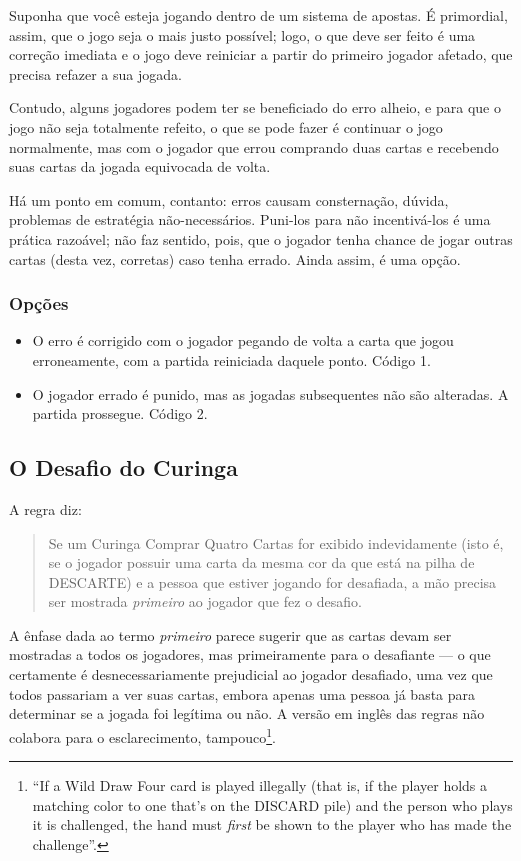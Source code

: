 Suponha que você esteja jogando dentro de um sistema de apostas. É primordial, assim, que o jogo seja o mais justo possível; logo, o que deve ser feito é uma correção imediata e o jogo deve reiniciar a partir do primeiro jogador afetado, que precisa refazer a sua jogada.

Contudo, alguns jogadores podem ter se beneficiado do erro alheio, e para que o jogo não seja totalmente refeito, o que se pode fazer é continuar o jogo normalmente, mas com o jogador que errou comprando duas cartas e recebendo suas cartas da jogada equivocada de volta.

Há um ponto em comum, contanto: erros causam consternação, dúvida, problemas de estratégia não-necessários. Puni-los para não incentivá-los é uma prática razoável; não faz sentido, pois, que o jogador tenha chance de jogar outras cartas (desta vez, corretas) caso tenha errado. Ainda assim, é uma opção.

\subsubsection{Opções}

\begin{itemize}
\item{O erro é corrigido com o jogador pegando de volta a carta que jogou erroneamente, com a partida reiniciada daquele ponto. Código 1.}
\item{O jogador errado é punido, mas as jogadas subsequentes não são alteradas. A partida prossegue. Código 2.}
\end{itemize}

\subsection{O Desafio do Curinga}

A regra diz:

\begin{quote}
Se um Curinga Comprar Quatro Cartas for exibido indevidamente (isto é, se o jogador possuir uma carta da mesma cor da que está na pilha de DESCARTE) e a pessoa que estiver jogando for desafiada, a mão precisa ser mostrada \textit{primeiro} ao jogador que fez o desafio.
\end{quote}

A ênfase dada ao termo \textit{primeiro} parece sugerir que as cartas devam ser mostradas a todos os jogadores, mas primeiramente para o desafiante --- o que certamente é desnecessariamente prejudicial ao jogador desafiado, uma vez que todos passariam a ver suas cartas, embora apenas uma pessoa já basta para determinar se a jogada foi legítima ou não. A versão em inglês das regras não colabora para o esclarecimento, tampouco\footnote{``If a Wild Draw Four card is played illegally (that is, if the player holds a matching color to one that’s on the DISCARD pile) and the person who plays it is challenged, the hand must \emph{first} be shown to the player who has made the challenge''.}.

